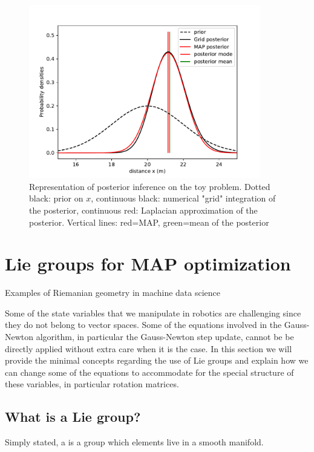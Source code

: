 \begin{figure}[h]
    \centering
    \includegraphics[width=0.9\textwidth]{figures/MAP_stereo1D.pdf}
    \caption{Representation of posterior inference on the toy problem. Dotted black: prior on $x$, 
    continuous black: numerical "grid" integration of the posterior, continuous red: Laplacian approximation of the posterior. Vertical lines: red=MAP, green=mean of the posterior
    }
    \label{fig:MAP_stereo1D}
 \end{figure}




\section{Lie groups for MAP optimization}

Examples of Riemanian geometry in machine data science \cite{miolane2020geomstats}



Some of the state variables that we manipulate in robotics are challenging since they do not belong to vector spaces. Some of the equations
involved in the Gauss-Newton algorithm, in particular the Gauss-Newton step update, cannot be be directly applied without extra care when it is the case.
In this section we will provide the minimal concepts regarding the use of Lie groups and explain how we can change some of the equations
to accommodate for the special structure of these variables, in particular rotation matrices.

\subsection{What is a Lie group?}
Simply stated, a  is a group which elements live in a smooth manifold.

